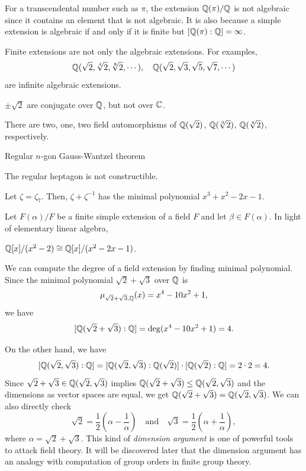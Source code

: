 \documentclass{../../large}
\begin{document}
\begin{ex}
For a transcendental number such as $\pi$, the extension $\mathbb{Q}(\pi)/\mathbb{Q}$ is not algebraic since it contains an element that is not algebraic.
It is also because a simple extension is algebraic if and only if it is finite but $[\mathbb{Q}(\pi):\mathbb{Q}]=\infty$.
\end{ex}

\begin{ex}
Finite extensions are not only the algebraic extensions.
For examples,
\[\mathbb{Q}(\sqrt2,\sqrt[4]2,\sqrt[8]2,\cdots),\quad\mathbb{Q}(\sqrt2,\sqrt3,\sqrt5,\sqrt7,\cdots)\]
are infinite algebraic extensions.
\end{ex}

\begin{ex}
$\pm\sqrt2$ are conjugate over $\mathbb{Q}$, but not over $\mathbb{C}$.

There are two, one, two field automorphisms of $\mathbb{Q}(\sqrt2)$, $\mathbb{Q}(\sqrt[3]2)$, $\mathbb{Q}(\sqrt[4]2)$, respectively.
\end{ex}



\begin{prb}
Regular $n$-gon
Gauss-Wantzel theorem
\begin{parts}
\item The regular heptagon is not constructible.
\end{parts}
\end{prb}
\begin{pf}
Let $\zeta=\zeta_7$.
Then, $\zeta+\zeta^{-1}$ has the minimal polynomial $x^3+x^2-2x-1$.
\end{pf}



\begin{prb}
Let $F(\alpha)/F$ be a finite simple extension of a field $F$ and let $\beta\in F(\alpha)$.
In light of elementary linear algebra,
\end{prb}

\begin{prb}
$\mathbb{Q}[x]/(x^2-2)\cong\mathbb{Q}[x]/(x^2-2x-1)$.
\end{prb}

\begin{prb}
We can compute the degree of a field extension by finding minimal polynomial.
Since the minimal polynomial $\sqrt2+\sqrt3$ over $\mathbb{Q}$ is
\[\mu_{\sqrt2+\sqrt3,\mathbb{Q}}(x)=x^4-10x^2+1,\]
we have
\[[\mathbb{Q}(\sqrt2+\sqrt3):\mathbb{Q}]=\deg(x^4-10x^2+1)=4.\]

On the other hand, we have
\[[\mathbb{Q}(\sqrt2,\sqrt3):\mathbb{Q}]=[\mathbb{Q}(\sqrt2,\sqrt3):\mathbb{Q}(\sqrt2)]\cdot[\mathbb{Q}(\sqrt2):\mathbb{Q}]=2\cdot2=4.\]
Since $\sqrt2+\sqrt3\in\mathbb{Q}(\sqrt2,\sqrt3)$ implies $\mathbb{Q}(\sqrt2+\sqrt3)\le\mathbb{Q}(\sqrt2,\sqrt3)$ and the dimensions as vector spaces are equal, we get $\mathbb{Q}(\sqrt2+\sqrt3)=\mathbb{Q}(\sqrt2,\sqrt3)$.
We can also directly check
\[\sqrt2=\frac12\left(\alpha-\frac1\alpha\right)\quad\text{and}\quad\sqrt3=\frac12\left(\alpha+\frac1\alpha\right),\]
where $\alpha=\sqrt2+\sqrt3$.
This kind of \emph{dimension argument} is one of powerful tools to attack field theory.
It will be discovered later that the dimension argument has an analogy with computation of group orders in finite group theory.
\end{prb}
\end{document}

